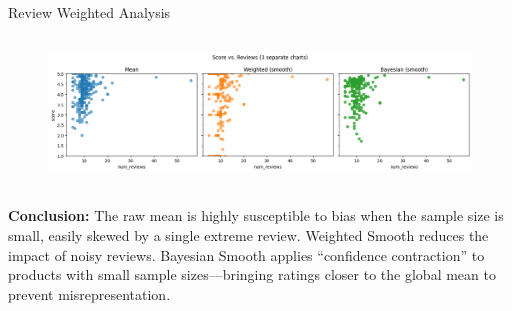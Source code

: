 \begin{frame}{Review Weighted Analysis}

	\vspace{-15pt}
	\begin{figure}
		\centering
			\includegraphics[height=4cm]{pic/weight_1.png}
	\end{figure}

    \textbf{Conclusion:} The raw mean is highly susceptible to bias when the sample size is small, easily skewed by a single extreme review. Weighted Smooth reduces the impact of noisy reviews. Bayesian Smooth applies “confidence contraction” to products with small sample sizes—bringing ratings closer to the global mean to prevent misrepresentation.

\end{frame}
